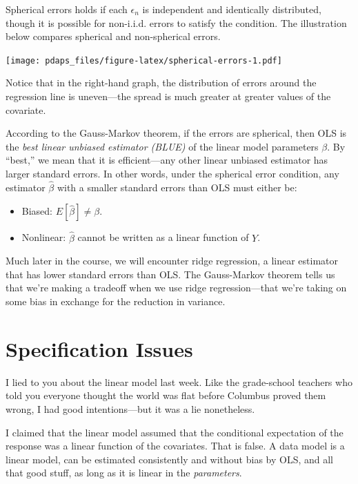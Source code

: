 \documentclass[
  12pt,
  oneside,openany]{book}
\begin{document}
Spherical errors holds if each \(\epsilon_n\) is independent and identically distributed, though it is possible for non-i.i.d. errors to satisfy the condition. The illustration below compares spherical and non-spherical errors.

\texttt{[image: pdaps\_files/figure-latex/spherical-errors-1.pdf]}

Notice that in the right-hand graph, the distribution of errors around the regression line is uneven---the spread is much greater at greater values of the covariate.

According to the Gauss-Markov theorem, if the errors are spherical, then OLS is the \emph{best linear unbiased estimator (BLUE)} of the linear model parameters \(\beta\). By ``best,'' we mean that it is efficient---any other linear unbiased estimator has larger standard errors. In other words, under the spherical error condition, any estimator \(\hat{\beta}\) with a smaller standard errors than OLS must either be:

\begin{itemize}
\item
  Biased: \(E[\hat{\beta}] \neq \beta\).
\item
  Nonlinear: \(\hat{\beta}\) cannot be written as a linear function of \(Y\).
\end{itemize}

Much later in the course, we will encounter ridge regression, a linear estimator that has lower standard errors than OLS. The Gauss-Markov theorem tells us that we're making a tradeoff when we use ridge regression---that we're taking on some bias in exchange for the reduction in variance.

\hypertarget{specification}{%
\chapter{Specification Issues}\label{specification}}

\providecommand{\pderiv}{}
\renewcommand{\pderiv}[2]{\frac{\partial{}#1}{\partial{}#2}}

I lied to you about the linear model last week. Like the grade-school teachers who told you everyone thought the world was flat before Columbus proved them wrong, I had good intentions---but it was a lie nonetheless.

I claimed that the linear model assumed that the conditional expectation of the response was a linear function of the covariates. That is false. A data model is a linear model, can be estimated consistently and without bias by OLS, and all that good stuff, as long as it is linear in the \emph{parameters}.
\end{document}
